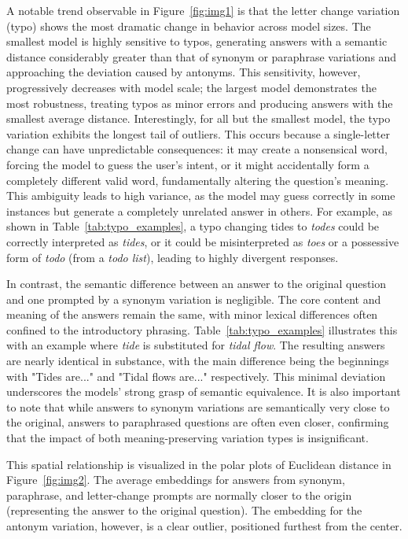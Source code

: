 \documentclass[a4paper,
               ]{jacow}
\begin{document}
A notable trend observable in Figure~\ref{fig:img1} is that the letter change variation (typo) shows the most dramatic change in behavior across model sizes. The smallest model is highly sensitive to typos, generating answers with a semantic distance considerably greater than that of synonym or paraphrase variations and approaching the deviation caused by antonyms. This sensitivity, however, progressively decreases with model scale; the largest model demonstrates the most robustness, treating typos as minor errors and producing answers with the smallest average distance. Interestingly, for all but the smallest model, the typo variation exhibits the longest tail of outliers. This occurs because a single-letter change can have unpredictable consequences: it may create a nonsensical word, forcing the model to guess the user's intent, or it might accidentally form a completely different valid word, fundamentally altering the question's meaning. This ambiguity leads to high variance, as the model may guess correctly in some instances but generate a completely unrelated answer in others. For example, as shown in Table~\ref{tab:typo_examples}, a typo changing tides to \emph{todes} could be correctly interpreted as \emph{tides}, or it could be misinterpreted as \emph{toes} or a possessive form of \emph{todo} (from a \emph{todo list}), leading to highly divergent responses.

In contrast, the semantic difference between an answer to the original question and one prompted by a synonym variation is negligible. The core content and meaning of the answers remain the same, with minor lexical differences often confined to the introductory phrasing. Table~\ref{tab:typo_examples} illustrates this with an example where \emph{tide} is substituted for \emph{tidal flow}. The resulting answers are nearly identical in substance, with the main difference being the beginnings with "Tides are..." and "Tidal flows are..." respectively. This minimal deviation underscores the models' strong grasp of semantic equivalence. It is also important to note that while answers to synonym variations are semantically very close to the original, answers to paraphrased questions are often even closer, confirming that the impact of both meaning-preserving variation types is insignificant.

This spatial relationship is visualized in the polar plots of Euclidean distance in Figure~\ref{fig:img2}. The average embeddings for answers from synonym, paraphrase, and letter-change prompts are normally closer to the origin (representing the answer to the original question). The embedding for the antonym variation, however, is a clear outlier, positioned furthest from the center.
\end{document}

